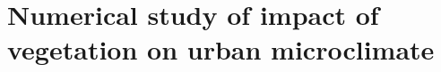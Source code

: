 \chapter{Numerical study of impact of vegetation on urban microclimate}
\label{ch:impactofvegetation}
%		


%
%
%
%
